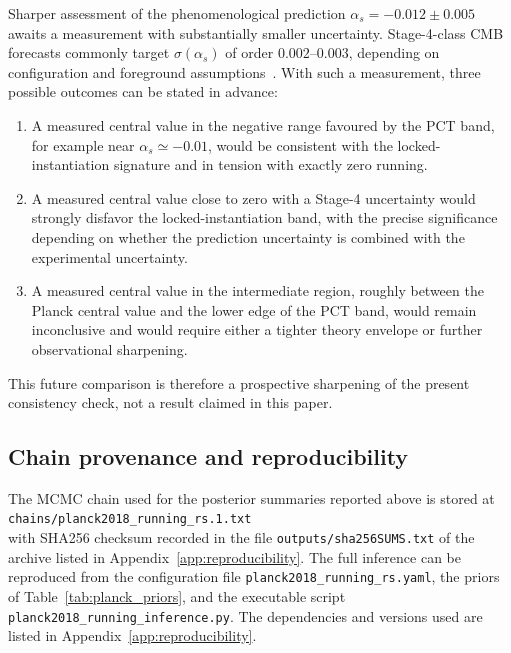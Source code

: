 ﻿\documentclass[12pt,a4paper]{article}
\theoremstyle{definition}
\begin{document}
Sharper assessment of the phenomenological prediction $\alpha_s = -0.012 \pm 0.005$ awaits a measurement with substantially smaller uncertainty. Stage-4-class CMB forecasts commonly target $\sigma(\alpha_s)$ of order $0.002$--$0.003$, depending on configuration and foreground assumptions~\citep{cmbs4sciencebook}. With such a measurement, three possible outcomes can be stated in advance:
\begin{enumerate}
  \item A measured central value in the negative range favoured by the PCT band, for example near $\alpha_s \simeq -0.01$, would be consistent with the locked-instantiation signature and in tension with exactly zero running.
  \item A measured central value close to zero with a Stage-4 uncertainty would strongly disfavor the locked-instantiation band, with the precise significance depending on whether the prediction uncertainty is combined with the experimental uncertainty.
  \item A measured central value in the intermediate region, roughly between the Planck central value and the lower edge of the PCT band, would remain inconclusive and would require either a tighter theory envelope or further observational sharpening.
\end{enumerate}
This future comparison is therefore a prospective sharpening of the present consistency check, not a result claimed in this paper.

\subsection{Chain provenance and reproducibility}
\label{sec:planck_provenance}

The MCMC chain used for the posterior summaries reported above is stored at\\
\texttt{chains/planck2018\_running\_rs.1.txt}\\
with SHA256 checksum recorded in the file \texttt{outputs/sha256SUMS.txt} of the archive listed in Appendix~\ref{app:reproducibility}. The full inference can be reproduced from the configuration file \texttt{planck2018\_running\_rs.yaml}, the priors of Table~\ref{tab:planck_priors}, and the executable script\\ \texttt{planck2018\_running\_inference.py}. The dependencies and versions used are listed in Appendix~\ref{app:reproducibility}.

\end{document}
